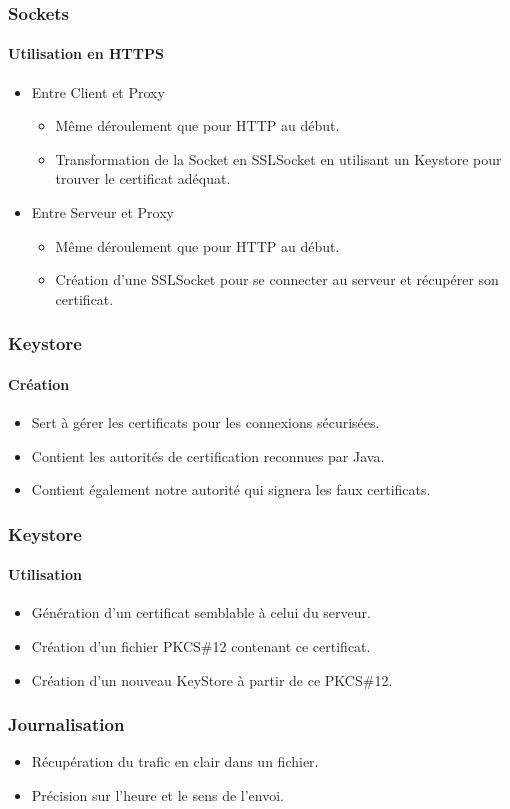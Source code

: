 	\begin{frame}
		\frametitle{Sockets}	
		\framesubtitle{Utilisation en HTTPS}
		\begin{itemize}
			\item Entre Client et Proxy
			\begin{itemize}
				\item Même déroulement que pour HTTP au début.
				\item Transformation de la Socket en SSLSocket en utilisant un Keystore pour trouver le certificat adéquat.
			\end{itemize}
			\item Entre Serveur et Proxy
			\begin{itemize}
				\item Même déroulement que pour HTTP au début.
				\item Création d'une SSLSocket pour se connecter au serveur et récupérer son certificat.
			\end{itemize}
		\end{itemize}
	\end{frame}

	\begin{frame}
		\frametitle{Keystore}
		\framesubtitle{Création}
		\begin{itemize}
			\item Sert à gérer les certificats pour les connexions sécurisées.
			\item Contient les autorités de certification reconnues par Java.
			\item Contient également notre autorité qui signera les faux certificats.
		\end{itemize}
	\end{frame} 
	
 		\begin{frame}
		\frametitle{Keystore}
		\framesubtitle{Utilisation}
		\begin{itemize}
			\item Génération d'un certificat semblable à celui du serveur.
			\item Création d'un fichier PKCS\#12 contenant ce certificat.
			\item Création d'un nouveau KeyStore à partir de ce PKCS\#12.
		\end{itemize}				
	\end{frame}
	
	\begin{frame}
		\frametitle{Journalisation}
		\begin{itemize}
			\item Récupération du trafic en clair dans un fichier.
			\item Précision sur l'heure et le sens de l'envoi.
		\end{itemize}				
	\end{frame} 
	
	
